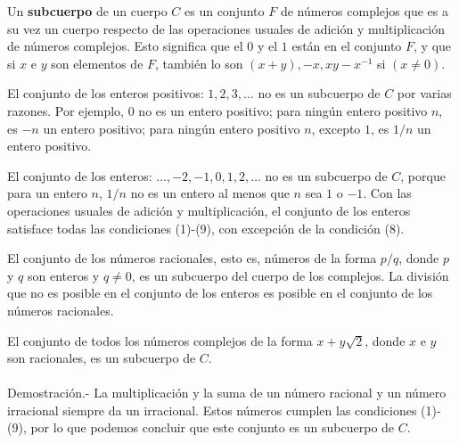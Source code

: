 \begin{tcolorbox}
    Un \textbf{subcuerpo} de un cuerpo $C$ es un conjunto $F$ de números complejos que es a su vez un cuerpo respecto de las operaciones usuales de adición y multiplicación  de números complejos. Esto significa que el $0$ y el $1$ están en el conjunto $F$, y que si $x$ e $y$ son elementos de $F$, también lo son $(x+y), -x,xy-x^{-1}$ si $(x\neq 0)$.
\end{tcolorbox}


\begin{ejem}
    El conjunto de los enteros positivos: $1,2,3,\ldots$ no es un subcuerpo de $C$ por varias razones. Por ejemplo, $0$ no es un entero positivo; para ningún entero positivo $n$, es $-n$ un entero positivo; para ningún entero positivo $n$, excepto $1$, es $1/n$ un entero positivo.\\
\end{ejem}

\begin{ejem}
    El conjunto de los enteros: $\ldots,-2,-1,0,1,2,\ldots$ no es un subcuerpo de $C$, porque para un entero $n$, $1/n$ no es un entero al menos que $n$ sea $1$ o $-1$. Con las operaciones usuales de adición y multiplicación, el conjunto de los enteros satisface todas las condiciones (1)-(9), con excepción de la condición (8).\\
\end{ejem}

\begin{ejem}
    El conjunto de los números racionales, esto es, números de la forma $p/q$, donde $p$ y $q$ son enteros y $q\neq 0$, es un subcuerpo del cuerpo de los complejos. La división que no es posible en el conjunto de los enteros es posible en el conjunto de los números racionales.\\
\end{ejem}

\begin{ejem}
    El conjunto de todos los números complejos de la forma $x+y\sqrt{2}$, donde $x$ e $y$ son racionales, es un subcuerpo de $C$.\\\\
	Demostración.-\; La multiplicación y la suma de un número racional y un número irracional siempre da un irracional. Estos números cumplen las condiciones (1)-(9), por lo que podemos concluir que este conjunto es un subcuerpo de $C$.\\
\end{ejem}

